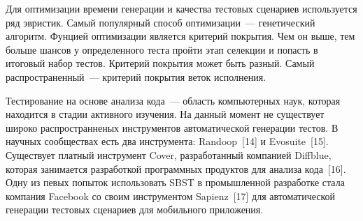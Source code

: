 Для оптимизации времени генерации и качества тестовых сценариев используется ряд эвристик. Самый популярный способ оптимизации~--- генетический алгоритм. Фунцией оптимизации является критерий покрытия. Чем он выше, тем больше шансов у определенного теста пройти этап селекции и попасть в итоговый набор тестов. Критерий покрытия может быть разный. Самый распространенный~--- критерий покрытия веток исполнения. 

Тестирование на основе анализа кода~--- область компьютерных наук, которая находится в стадии активного изучения. На данный момент не существует широко распространненых инструментов автоматической генерации тестов. В научных сообществах есть два инструмента: Randoop~[14] и Evosuite~[15]. Существует платный инструмент Cover, разработанный компанией Diffblue, которая занимается разработкой программных продуктов для анализа кода~[16].  Одну из певых попыток использовать SBST в промышленной разработке стала компания Facebook со своим инструментом Sapienz~[17] для автоматической генерации тестовых сценариев для мобильного приложения. 

